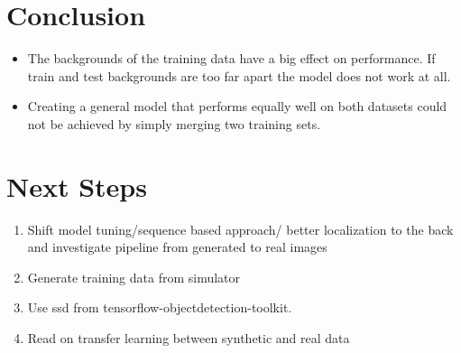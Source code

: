 \documentclass{article}
\begin{document}
\section{Conclusion}

\begin{itemize}
	\item The backgrounds of the training data have a big effect on performance. If train and test backgrounds are too far apart the model does not work at all.
	\item Creating a general model that performs equally well on both datasets could not be achieved by simply merging two training sets.
\end{itemize}

\section{Next Steps}
\begin{enumerate}
		\item Shift model tuning/sequence based approach/ better localization to the back and investigate pipeline from generated to real images
		\item Generate training data from simulator
		\item Use ssd from tensorflow-objectdetection-toolkit.
		\item Read on transfer learning between synthetic and real data

\end{enumerate}









\end{document}
